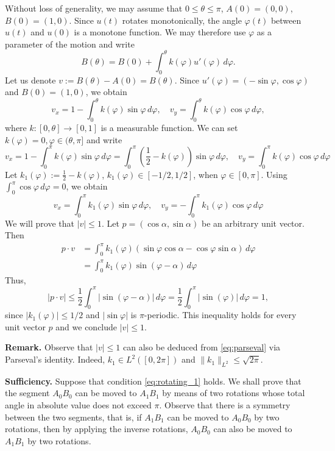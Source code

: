 \documentclass[a4paper,12pt,reqno]{amsart}
\begin{document}
Without loss of generality, we may assume that $0\le \theta\le \pi$, $A(0)=(0,0)$, $B(0)=(1,0)$. Since \(u(t)\) rotates monotonically, the angle \(\varphi(t)\) between \(u(t)\) and \(u(0)\) is a monotone function. We may therefore use \(\varphi\) as a parameter of the motion and write
\[
B(\theta)= B(0)+\int_0^{\theta} k(\varphi) u'(\varphi)\, d\varphi.
\]
Let us denote $v:=B(\theta)-A(0)=B(\theta)$. Since $u'(\varphi)=(-\sin\varphi, \cos\varphi)$ and $B(0)=(1,0)$, we obtain
\[
v_x=1-\int_0^\theta k(\varphi)\sin\varphi\,d\varphi,
\quad
v_y=\int_0^\theta k(\varphi)\cos\varphi\,d\varphi,
\]
where \(k:[0,\theta]\to[0,1]\) is a measurable function. We can set $k(\varphi)=0, \varphi\in (\theta,\pi]$ and write 
\[
v_x=1-\int_0^\pi k(\varphi)\sin\varphi\,d\varphi=\int_0^{\pi} \left(\frac{1}{2}-k(\varphi)\right)\sin\varphi \,d\varphi,
\quad
v_y=\int_0^\pi k(\varphi)\cos\varphi\,d\varphi
\]
Let $k_1(\varphi):=\frac{1}{2}-k(\varphi)$, $k_1(\varphi)\in [-1/2,1/2]$, when $\varphi\in[0,\pi]$. Using $\int_0^{\pi}\cos\varphi\,d\varphi=0$, we obtain
\begin{equation}
\label{eq:parseval}
    v_x=\int_0^{\pi} k_1(\varphi)\sin\varphi \,d\varphi, \quad v_y=-\int_0^\pi k_1(\varphi)\cos\varphi\,d\varphi
\end{equation}
 We will prove that \(|v|\le 1\). Let \(p=(\cos\alpha,\sin\alpha)\) be an arbitrary unit vector. Then
\begin{align*}   
p\cdot v &=\int_0^\pi k_1(\varphi)\left(\sin\varphi\cos\alpha -\cos\varphi\sin\alpha\right) \,d\varphi\\
&=\int_0^{\pi} k_1(\varphi) \sin(\varphi-\alpha)\, d\varphi
\end{align*}
Thus,
\[
|p\cdot v|\le \frac{1}{2}\int_0^{\pi} \left|\sin(\varphi-\alpha)\right|\, d\varphi= \frac{1}{2}\int_0^{\pi} \left|\sin(\varphi)\right|\, d\varphi =1,
\]
since $|k_1(\varphi)|\le 1/2$ and $|\sin\varphi|$ is $\pi$-periodic. This inequality holds for every unit vector \(p\) and we conclude $|v|\le 1$.

\smallskip
\noindent \textbf{Remark.} Observe that \( |v|\le 1 \) can also be deduced from \eqref{eq:parseval} via Parseval's identity. Indeed, \(k_1\in L^2([0,2\pi])\) and \(\|k_1\|_{L^2}\le \sqrt{2\pi}\).

\smallskip
\noindent\textbf{Sufficiency.} Suppose that condition \eqref{eq:rotating_1} holds. We shall prove that the segment $A_0B_0$ can be moved to $A_1B_1$ by means of two rotations whose total angle in absolute value does not exceed $\pi$. Observe that there is a symmetry between the two segments, that is, if $A_1B_1$ can be moved to $A_0B_0$ by two rotations, then by applying the inverse rotations, $A_0B_0$ can also be moved to $A_1B_1$ by two rotations.
\end{document}
